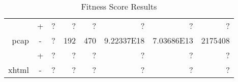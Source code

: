 \begin{table}[H]
\begin{tabular}{|r|c|r|r|r|r|r|r|}
                               & +                                                                           &              ?                                                              &                             ?                                                 &                                ?                                             &                                         ?                                    &                                        ?                                        &                                 ?                                              \\ \cline{2-8} 
\multirow{-2}{*}{pcap}         & \cellcolor[HTML]{C0C0C0}-                                                   & \cellcolor[HTML]{C0C0C0} ?                                                  & \cellcolor[HTML]{C0C0C0} 192                                                  & \cellcolor[HTML]{C0C0C0} 470                                                 & \cellcolor[HTML]{C0C0C0} 9.22337E18                                          & \cellcolor[HTML]{C0C0C0} 7.03686E13                                             & \cellcolor[HTML]{C0C0C0} 2175408                                               \\ \hline \hline
                               & +                                                                           &       ?                                                                     &                              ?                                                &                                 ?                                            &                                        ?                                     &                                         ?                                       &                                      ?                                         \\ \cline{2-8} 
\multirow{-2}{*}{xhtml}        & \cellcolor[HTML]{C0C0C0}-                                                   & \cellcolor[HTML]{C0C0C0}    ?                                               & \cellcolor[HTML]{C0C0C0} ?                                                    & \cellcolor[HTML]{C0C0C0}  ?                                                  & \cellcolor[HTML]{C0C0C0}    ?                                                & \cellcolor[HTML]{C0C0C0}  ?                                                     & \cellcolor[HTML]{C0C0C0}   ?                                                   \\ \hline
\end{tabular}
\caption{Fitness Score Results}
\label{tbl:fitness}
\end{table}


